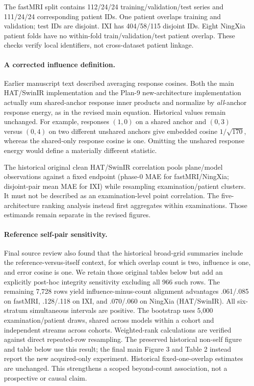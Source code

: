 The fastMRI split contains 112/24/24 training/validation/test series and 111/24/24 corresponding patient IDs. One patient overlaps training and validation; test IDs are disjoint. IXI has 404/58/115 disjoint IDs. Eight NingXia patient folds have no within-fold train/validation/test patient overlap. These checks verify local identifiers, not cross-dataset patient linkage.

\paragraph{A corrected influence definition.}
Earlier manuscript text described averaging response cosines. Both the main HAT/SwinIR implementation and the Plan-9 new-architecture implementation actually sum shared-anchor response inner products and normalize by \emph{all}-anchor response energy, as in the revised main equation. Historical values remain unchanged. For example, responses $(1,0)$ on a shared anchor and $(0,3)$ versus $(0,4)$ on two different unshared anchors give embedded cosine $1/\sqrt{170}$, whereas the shared-only response cosine is one. Omitting the unshared response energy would define a materially different statistic.

The historical original clean HAT/SwinIR correlation pools plane/model observations against a fixed endpoint (phase-0 MAE for fastMRI/NingXia; disjoint-pair mean MAE for IXI) while resampling examination/patient clusters. It must not be described as an examination-level point correlation. The five-architecture ranking analysis instead first aggregates within examinations. Those estimands remain separate in the revised figures.

\paragraph{Reference self-pair sensitivity.}
Final source review also found that the historical broad-grid summaries include the reference-versus-itself context, for which overlap count is two, influence is one, and error cosine is one. We retain those original tables below but add an explicitly post-hoc integrity sensitivity excluding all 966 such rows. The remaining 7,728 rows yield influence-minus-count alignment advantages .061/.085 on fastMRI, .128/.118 on IXI, and .070/.060 on NingXia (HAT/SwinIR). All six-stratum simultaneous intervals are positive. The bootstrap uses 5,000 examination/patient draws, shared across models within a cohort and independent streams across cohorts. Weighted-rank calculations are verified against direct repeated-row resampling. The preserved historical non-self figure and table below use this result; the final main Figure 3 and Table 2 instead report the new acquired-only experiment. Historical fixed-one-overlap estimates are unchanged. This strengthens a scoped beyond-count association, not a prospective or causal claim.

